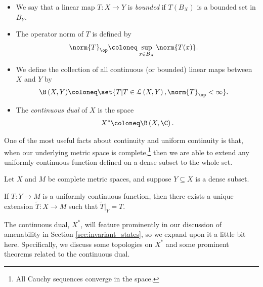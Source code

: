 \documentclass[10pt]{mypackage2}
\begin{document}
\begin{definition}\hfill
  \begin{itemize}
    \item We say that a linear map $T\colon X\rightarrow Y$ is \textit{bounded} if $T\left( B_X \right)$ is a bounded set in $B_Y$.
    \item The operator norm of $T$ is defined by
      \begin{align*}
        \norm{T}_{\op} &\coloneq \sup_{x\in B_{X}} \norm{T(x)}.
      \end{align*}
    \item We define the collection of all continuous (or bounded) linear maps between $X$ and $Y$ by
      \begin{align*}
        \B\left( X,Y \right) &\coloneq \set{T | T\in \mathcal{L}\left( X,Y \right), \norm{T}_{\op} < \infty}.
      \end{align*}
    \item The \textit{continuous dual} of $X$ is the space
      \begin{align*}
        X^{\ast}\coloneq \B\left( X,\C \right).
      \end{align*}
  \end{itemize}
\end{definition}
One of the most useful facts about continuity and uniform continuity is that, when our underlying metric space is complete,\footnote{All Cauchy sequences converge in the space.} then we are able to extend any uniformly continuous function defined on a dense subset to the whole set.
\begin{theorem}\label{thm:extending_uniformly_continuous_functions}
  Let $X$ and $M$ be complete metric spaces, and suppose $Y\subseteq X$ is a dense subset.\newline

  If $T\colon Y\rightarrow M$ is a uniformly continuous function, then there exists a unique extension $\widetilde{T}\colon X\rightarrow M$ such that $\widetilde{T}|_{Y} = T$.
\end{theorem}
The continuous dual, $X^{\ast}$, will feature prominently in our discussion of amenability in Section \ref{sec:invariant_states}, so we expand upon it a little bit here. Specifically, we discuss some topologies on $X^{\ast}$ and some prominent theorems related to the continuous dual.
\end{document}
